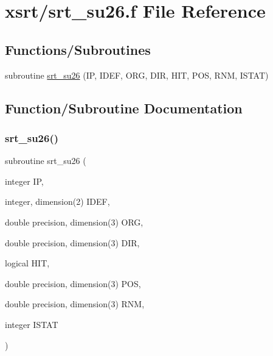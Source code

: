 \hypertarget{srt__su26_8f}{}\section{xsrt/srt\+\_\+su26.f File Reference}
\label{srt__su26_8f}
\subsection*{Functions/\+Subroutines}
\begin{DoxyCompactItemize}
\item 
subroutine \hyperlink{srt__su26_8f_af9ea3d3829ab8af68041d67769f39d65}{srt\+\_\+su26} (IP, I\+D\+EF, O\+RG, D\+IR, H\+IT, P\+OS, R\+NM, I\+S\+T\+AT)
\end{DoxyCompactItemize}


\subsection{Function/\+Subroutine Documentation}
\mbox{\label{srt__su26_8f_af9ea3d3829ab8af68041d67769f39d65}} 
\subsubsection{\texorpdfstring{srt\+\_\+su26()}{srt\_su26()}}
{\footnotesize\ttfamily subroutine srt\+\_\+su26 (\begin{DoxyParamCaption}\item[{integer}]{IP,  }\item[{integer, dimension(2)}]{I\+D\+EF,  }\item[{double precision, dimension(3)}]{O\+RG,  }\item[{double precision, dimension(3)}]{D\+IR,  }\item[{logical}]{H\+IT,  }\item[{double precision, dimension(3)}]{P\+OS,  }\item[{double precision, dimension(3)}]{R\+NM,  }\item[{integer}]{I\+S\+T\+AT }\end{DoxyParamCaption})}

